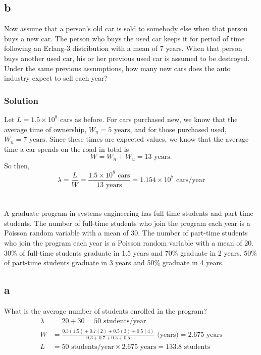 \documentclass{amsart}
\begin{document}
\subsection*{b}
Now assume that a person's old car is sold to somebody else when that person
buys a new car. The person who buys the used car keeps it for period of time
following an Erlang-3 distribution with a mean of 7 years. When that person buys
another used car, his or her previous used car is assumed to be destroyed. Under
the same previous assumptions, how many new cars does the auto industry
expect to sell each year?
\subsubsection*{Solution}
Let $L=1.5\times10^8\text{ cars}$ as before. For cars purchased new, we know
that the average time of ownership, $W_n = 5 \text{ years}$, and for those purchased
used, $W_u = 7 \text{ years}$. Since these times are expected values, we know
that the average time a car spends on the road in total is
\begin{equation}
  W = W_n+W_u=13\text{ years}.
\end{equation}
So then,
\begin{equation}
  \lambda = \frac{L}{W} = \frac{1.5\times10^8\text{ cars}}{13 \text{ years}}
  = 1.154\times10^7\text{ cars/year}
\end{equation}

\section{} %
A graduate program in systems engineering has full time students and part time students.
The number of full-time students who join the program each year is a Poisson random
variable with a mean of 30. The number of part-time students who join the program each
year is a Poisson random variable with a mean of 20. 30\% of full-time students graduate
in 1.5 years and 70\% graduate in 2 years. 50\% of part-time students graduate in 3 years
and 50\% graduate in 4 years.

\subsection*{a}
What is the average number of students enrolled in the program?
\begin{align}
\lambda &= 20 + 30 = 50\text{ students/year}\\
  W &=\frac{0.3(1.5) + 0.7(2) + 0.5(3) + 0.5(4)}{0.3 + 0.7 + 0.5 + 0.5} \text{ (years)}
     = 2.675 \text{ years} \\
  L &= 50\text{ students/year} \times 2.675 \text{ years} = 133.8\text{ students}
\end{align}
\end{document}
